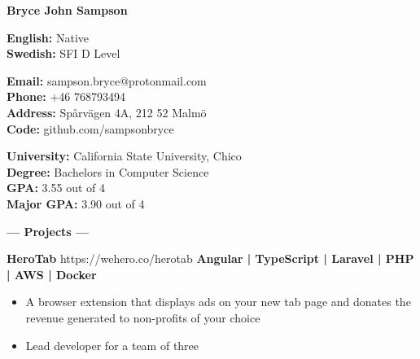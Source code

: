 \documentclass[12pt]{article}
\begin{document}
\setmainfont{Futura PT}
\begin{multicols}{2}
    \null \vfill
	\color{white}
	\begin{Huge}\textbf{Bryce John Sampson}\end{Huge}
	\vfill \null
	\columnbreak

\begin{accentbox}
	\textbf{English:} \hfill Native \\
	\textbf{Swedish:} \hfill SFI D Level
\end{accentbox}
\end{multicols}

\fontsize{12}{1.2}
\smallbreak
\begin{multicols}{2}

\begin{accentbox}
        \color{secondary}
        \textbf{Email:} \hfill sampson.bryce@protonmail.com \\
        \textbf{Phone:} \hfill +46 768793494 \\
        \textbf{Address:} \hfill Spårvägen 4A, 212 52 Malmö \\ 
        \textbf{Code:} \hfill github.com/sampsonbryce   
\end{accentbox}
\begin{accentbox}
        \color{secondary}
    	\textbf{University:} \hfill California State University, Chico \\
    	\textbf{Degree:} \hfill Bachelors in Computer Science \\
    	\textbf{GPA:} \hfill 3.55 out of 4 \\
    	\textbf{Major GPA:} \hfill 3.90 out of 4 
\end{accentbox}
\end{multicols}

    \color{white}
    \vspace{-2mm}

    \begin{center}
    \textbf{\Large--- Projects ---}\\
    \end{center}
    
    \vspace{-2mm}
    \begin{footnotesize}

    \textbf{\color{primary}\large HeroTab }{\color{primary}\footnotesize https://wehero.co/herotab} \hfill \textbf{\color{Cerulean}Angular | TypeScript | Laravel | PHP | AWS | Docker}
    \vspace{-1mm}
    \begin{itemize}
        \setlength{\itemsep}{0pt}
        \item A browser extension that displays ads on your new tab page and donates the revenue generated to non-profits of your choice
        \item Lead developer for a team of three 
    \end{itemize}

    \end{footnotesize}
\end{document}
